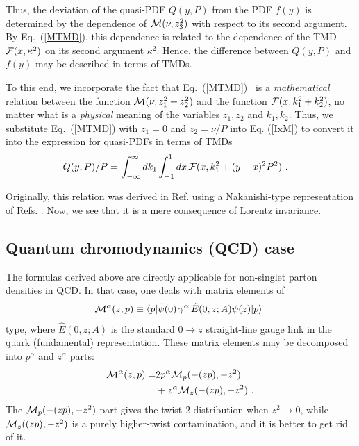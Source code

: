 \documentclass[aps,prd,twocolumn,showpacs,preprintnumbers,superscriptaddress,groupedaddress]{revtex4-1}
\newcommand{\nn}{\nonumber \\ }
\begin{document}
Thus, the deviation of the quasi-PDF $Q(y,  P)$ from  the PDF $f(y)$
is determined by the dependence of ${\cal M} (\nu,  z_3^2)$
with respect to its second argument.
By  \mbox{Eq. (\ref{MTMD}),}  this dependence is related to the dependence
of the TMD  $ {\cal F} (x, \kappa^2)$ on its second argument $\kappa^2$.
Hence,  the difference between  $Q(y,  P)$ and  $f(y)$
may be   described in terms of TMDs. 

To this end, we  
incorporate the fact that   \mbox{Eq. (\ref{MTMD}) } 
is a {\it mathematical}  relation between 
  the function  \mbox{${\cal M} (\nu,  z_1^2+z_2^2) $} 
and  the function      $ {\cal F} (x, k_1^2+k_2^2)$, 
no matter what is a  {\it physical}  meaning of the variables 
$z_1,z_2$ and $k_1,k_2$. 
Thus, we
 substitute  \mbox{Eq. (\ref{MTMD})}   with  $z_1=0$ and $z_2 =\nu/P$ 
into  Eq. (\ref{IxM})  to  convert it   into the  
expression for  quasi-PDFs in terms of TMDs 
  \begin{align}
 Q(y, P) /P =  & \,\int_{-\infty}^{\infty} d  k_1
\int_{-1} ^ {1} d  x \,   {\cal F} (x, k_1^2+(y-x)^2P^2 )
  \  . 
 \label{QTMD}
 \end{align} 
 
 Originally, this relation was derived in Ref.  \cite{Radyushkin:2016hsy} using
 a Nakanishi-type representation of Refs.   \cite{Radyushkin:2014vla,Radyushkin:2015gpa}.
 Now, we see that it is a mere consequence of  Lorentz invariance. 
 
 
\subsection{Quantum chromodynamics (QCD)  case}  

The formulas derived above are
directly   applicable for non-singlet parton densities   in QCD.
In that case,  one    deals with matrix elements  of  
    \begin{align}
 {\cal M}^\alpha  (z,p) \equiv \langle  p |  \bar \psi (0) \,
 \gamma^\alpha \,  { \hat E} (0,z; A) \psi (z) | p \rangle \  
\label{Malpha}
\end{align}
type, where  $
{ \hat E}(0,z; A)$ is  the  standard  $0\to z$ straight-line gauge link 
 in the quark (fundamental) representation.
 These matrix elements   may be decomposed into $p^\alpha$ and $z^\alpha$ parts:
\begin{align} 
{\cal M}^\alpha  (z,p) = &2 p^\alpha  {\cal M}_p (-(zp), -z^2) 
\nn & + z^\alpha  {\cal M}_z (-(zp),-z^2)
\ .
\end{align}
The ${\cal M}_p (-(zp), -z^2) $ part gives the twist-2 distribution when  $z^2 \to 0$,
while $ {\cal M}_z ((zp),-z^2)$ is a  purely higher-twist contamination,
and it  is better to  get rid of it. 
\end{document}
